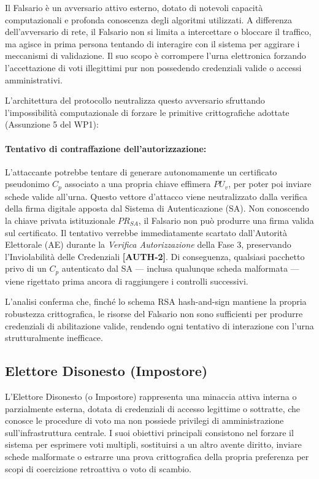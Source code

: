 Il Falsario è un avversario attivo esterno, dotato di notevoli capacità computazionali e profonda conoscenza degli algoritmi utilizzati. A differenza dell'avversario di rete, il Falsario non si limita a intercettare o bloccare il traffico, ma agisce in prima persona tentando di interagire con il sistema per aggirare i meccanismi di validazione. Il suo scopo è corrompere l'urna elettronica forzando l'accettazione di voti illegittimi pur non possedendo credenziali valide o accessi amministrativi.

L'architettura del protocollo neutralizza questo avversario sfruttando l'impossibilità computazionale di forzare le primitive crittografiche adottate (Assunzione 5 del WP1):

\paragraph{Tentativo di contraffazione dell'autorizzazione:} L'attaccante potrebbe tentare di generare autonomamente un certificato pseudonimo $C_p$ associato a una propria chiave effimera $PU_v$, per poter poi inviare schede valide all'urna. Questo vettore d'attacco viene neutralizzato dalla verifica della firma digitale apposta dal Sistema di Autenticazione (SA). Non conoscendo la chiave privata istituzionale $PR_{SA}$, il Falsario non può produrre una firma valida sul certificato. Il tentativo verrebbe immediatamente scartato dall'Autorità Elettorale (AE) durante la \textit{Verifica Autorizzazione} della Fase 3, preservando l'Inviolabilità delle Credenziali \textbf{[AUTH-2]}. Di conseguenza, qualsiasi pacchetto privo di un $C_p$ autenticato dal SA --- inclusa qualunque scheda malformata --- viene rigettato prima ancora di raggiungere i controlli successivi.

L'analisi conferma che, finché lo schema RSA hash-and-sign mantiene la propria robustezza crittografica, le risorse del Falsario non sono sufficienti per produrre credenziali di abilitazione valide, rendendo ogni tentativo di interazione con l'urna strutturalmente inefficace.

\subsection{Elettore Disonesto (Impostore)}
\label{subsec:3.2.4_elettore_disonesto}

L'Elettore Disonesto (o Impostore) rappresenta una minaccia attiva interna o parzialmente esterna, dotata di credenziali di accesso legittime o sottratte, che conosce le procedure di voto ma non possiede privilegi di amministrazione sull'infrastruttura centrale. I suoi obiettivi principali consistono nel forzare il sistema per esprimere voti multipli, sostituirsi a un altro avente diritto, inviare schede malformate o estrarre una prova crittografica della propria preferenza per scopi di coercizione retroattiva o voto di scambio.

